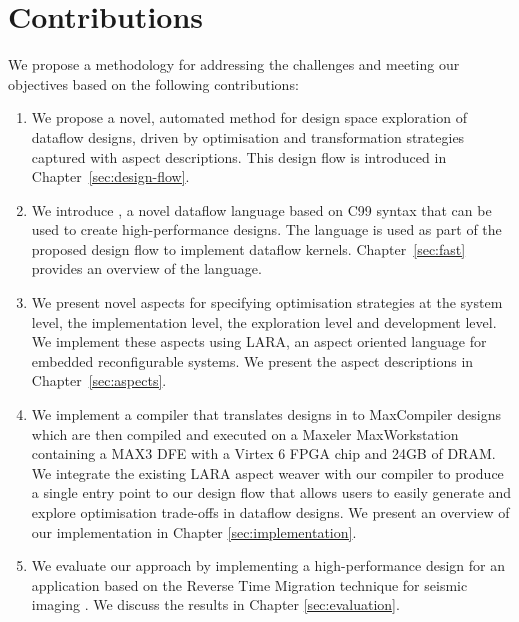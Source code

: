 \section{Contributions}


We propose a methodology for addressing the challenges and meeting our
objectives based on the following contributions:

\begin{enumerate}

\item We propose a novel, automated method for design space
  exploration of dataflow designs, driven by optimisation and
  transformation strategies captured with aspect descriptions. This
  design flow is introduced in Chapter~\ref{sec:design-flow}.

\item We introduce \FAST{}, a novel dataflow language based on C99
  syntax that can be used to create high-performance designs. The
  language is used as part of the proposed design flow to implement
  dataflow kernels. Chapter~\ref{sec:fast} provides an overview of the
  \FAST{} language.

\item We present novel aspects for specifying optimisation strategies
  at the system level, the implementation level, the exploration level
  and development level. We implement these aspects using
  LARA, an
  aspect oriented language for embedded reconfigurable systems. We present
  the aspect descriptions in Chapter~\ref{sec:aspects}.

\item We implement a compiler that translates designs in \FAST{} to
  MaxCompiler designs which are then compiled and
  executed on a Maxeler MaxWorkstation containing a MAX3 DFE with a
  Virtex 6 FPGA chip and 24GB of DRAM.  We integrate the existing LARA
  aspect weaver with our compiler to produce a single entry point to
  our design flow that allows users to easily generate and explore
  optimisation trade-offs in dataflow designs. We present an overview
  of our implementation in Chapter \ref{sec:implementation}.

\item We evaluate our approach by implementing a high-performance
  design for an application based on the Reverse Time Migration
  technique for seismic imaging
  \cite{Xinyu:Qiwei:Luk:Qiang:Pell:2012}. We discuss the results in
  Chapter \ref{sec:evaluation}.
\end{enumerate}

